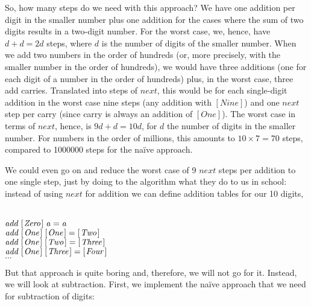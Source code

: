 \documentclass{scrreprt}
\newcommand{\Conid}[1]{\mathit{#1}}
\newcommand{\Varid}[1]{\mathit{#1}}
\begin{document}
So, how many steps do we need with this approach?
We have one addition per digit in the smaller number
plus one addition for the cases where the
sum of two digits results in a two-digit number.
For the worst case, we, hence, have $d + d = 2d$ steps, where $d$ 
is the number of digits of the smaller number.
When we add two numbers in the order of hundreds
(or, more precisely, with the smaller number
in the order of hundreds),
we would have three additions 
(one for each digit of a number in the order of hundreds)
plus, in the worst case, three add carries.
Translated into steps of $next$,
this would be for each single-digit addition in the worst case
nine steps (any addition with $[Nine]$)
and one $next$ step per carry 
(since carry is always an addition of $[One]$).
The worst case in terms of $next$, hence, is
$9d + d = 10d$, 
for $d$ the number of digits in the smaller number.
For numbers in the order of millions,
this amounts to $10 \times 7 = 70$ steps,
compared to \num{1000000} steps for the na\"ive approach.

We could even go on and reduce the worst case
of 9 $next$ steps per addition to one single step,
just by doing to the algorithm
what they do to us in school:
instead of using $next$ for addition
we can define addition tables for our 10 digits,
\ie\ 

\begin{minipage}{\textwidth}
\ensuremath{\Varid{add}\;[\mskip1.5mu \Conid{Zero}\mskip1.5mu]\;\Varid{a}\mathrel{=}\Varid{a}}\\
\ensuremath{\Varid{add}\;[\mskip1.5mu \Conid{One}\mskip1.5mu]\;[\mskip1.5mu \Conid{One}\mskip1.5mu]\mathrel{=}[\mskip1.5mu \Conid{Two}\mskip1.5mu]}\\
\ensuremath{\Varid{add}\;[\mskip1.5mu \Conid{One}\mskip1.5mu]\;[\mskip1.5mu \Conid{Two}\mskip1.5mu]\mathrel{=}[\mskip1.5mu \Conid{Three}\mskip1.5mu]}\\
\ensuremath{\Varid{add}\;[\mskip1.5mu \Conid{One}\mskip1.5mu]\;[\mskip1.5mu \Conid{Three}\mskip1.5mu]\mathrel{=}[\mskip1.5mu \Conid{Four}\mskip1.5mu]}\\
$\dots$
\end{minipage}

But that approach is quite boring
and, therefore, we will not go for it.
Instead, we will look at subtraction.
First, we implement the na\"ive approach
that we need for subtraction of digits:
\end{document}
